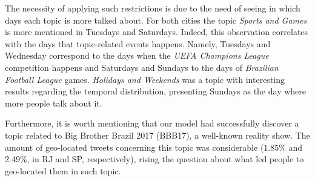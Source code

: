 The necessity of applying such restrictions is due to the need of seeing in which days each topic is more talked about. For both cities the topic \textit{Sports and Games} is more mentioned in Tuesdays and Saturdays. Indeed, this observation correlates with the days that topic-related events happens. Namely, Tuesdays and Wednesday correspond to the days when the \textit{UEFA Champions League} competition happens and Saturdays and Sundays to the days of \textit{Brazilian Football League} games. \textit{Holidays and Weekends} was a topic with interesting results regarding the temporal distribution, presenting Sundays as the day where more people talk about it. 

Furthermore, it is worth mentioning that our model had successfully discover a topic related to Big Brother Brazil 2017 (BBB17), a well-known reality show. The amount of geo-located tweets concerning this topic was considerable (1.85\% and 2.49\%, in RJ and SP, respectively), rising the question about what led people to geo-located them in such topic.
	
